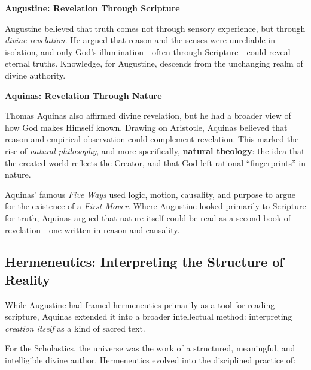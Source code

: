 \begin{tcolorbox}[colback=gray!5!white,colframe=black,title={From Revelation to Reason: Augustine vs. Aquinas}]
    \textbf{Augustine: Revelation Through Scripture}

    \medskip
    
    Augustine believed that truth comes not through sensory experience, but through \textit{divine revelation}. He argued that reason and the senses were unreliable in isolation, and only God’s illumination—often through Scripture—could reveal eternal truths. Knowledge, for Augustine, descends from the unchanging realm of divine authority.

    \medskip
    
    \textbf{Aquinas: Revelation Through Nature}

    \medskip
    
    Thomas Aquinas also affirmed divine revelation, but he had a broader view of how God makes Himself known. Drawing on Aristotle, Aquinas believed that reason and empirical observation could complement revelation. This marked the rise of \textit{natural philosophy}, and more specifically, \textbf{natural theology}: the idea that the created world reflects the Creator, and that God left rational ``fingerprints'' in nature.

    \medskip

    Aquinas’ famous \textit{Five Ways} used logic, motion, causality, and purpose to argue for the existence of a \textit{First Mover}. Where Augustine looked primarily to Scripture for truth, Aquinas argued that nature itself could be read as a second book of revelation—one written in reason and causality.
\end{tcolorbox}


    



\subsection{Hermeneutics: Interpreting the Structure of Reality}

While Augustine had framed hermeneutics primarily as a tool for reading scripture, Aquinas extended it into a broader intellectual method: interpreting \textit{creation itself} as a kind of sacred text.

For the Scholastics, the universe was the work of a structured, meaningful, and intelligible divine author. Hermeneutics evolved into the disciplined practice of:

